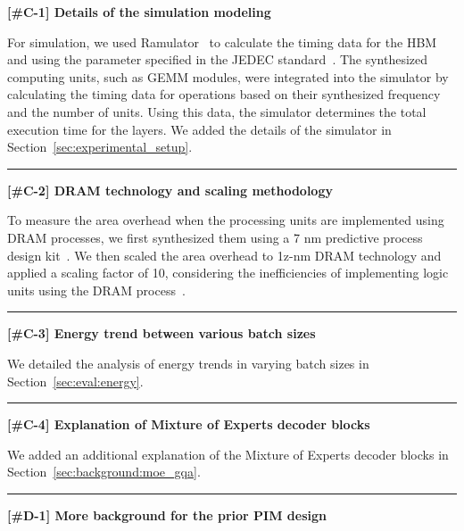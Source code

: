 \noindent
\textbf{[\#C-1] Details of the simulation modeling}

For simulation, we used Ramulator~\cite{cal-2023-ramulator2} to calculate the timing data for the HBM and \lowp using the parameter specified in the JEDEC standard~\cite{jedec-hbm3}.
The synthesized computing units, such as GEMM modules, were integrated into the simulator by calculating the timing data for operations based on their synthesized frequency and the number of units. 
Using this data, the simulator determines the total execution time for the layers.
We added the details of the simulator in Section~\ref{sec:experimental_setup}.

\noindent
\rule[0.5ex]{8.8cm}{0.5pt}

\noindent
\textbf{[\#C-2] DRAM technology and scaling methodology}

To measure the area overhead when the processing units are implemented using DRAM processes, we first synthesized them using a 7 nm predictive process design kit~\cite{asap7-2016}. 
We then scaled the area overhead to 1z-nm DRAM technology and applied a scaling factor of 10, considering the inefficiencies of implementing logic units using the DRAM process~\cite{hotchips-2019-upmem}.




\noindent
\rule[0.5ex]{8.8cm}{0.5pt}

\noindent
\textbf{[\#C-3] Energy trend between various batch sizes}
%

We detailed the analysis of energy trends in varying batch sizes in Section~\ref{sec:eval:energy}.


\noindent
\rule[0.5ex]{8.8cm}{0.5pt}

\noindent
\textbf{[\#C-4] Explanation of Mixture of Experts decoder blocks}
%

We added an additional explanation of the Mixture of Experts decoder blocks in Section~\ref{sec:background:moe_gqa}.


\noindent
\rule[0.5ex]{8.8cm}{0.5pt}


\noindent
\textbf{[\#D-1] More background for the prior PIM design}
%

